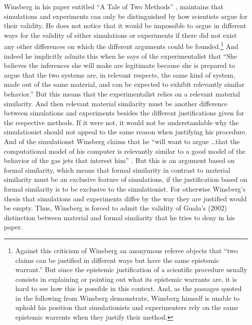 \documentclass[12pt, a4paper]{article}
\numberwithin{equation}{section}
\begin{document}
Winsberg in his paper entitled ``A Tale of Two Methods'' \citep{winsberg:2009}, maintains that simulations and experiments can only be distinguished by how scientists argue for their validity. He does not notice that it would be impossible to argue in different ways for the validity of either simulations or experiments if there did not exist any other differences on which the different arguments could be founded.\footnote{Against this criticism of Winsberg an anonymous referee objects that ``two claims can be justified in different ways but have the same epistemic warrant.'' But since the epistemic justification of a scientific procedure usually consists in explaining or pointing out what its epistemic warrants are, it is hard to see how this is possible in this context. And, as the passages quoted in the following from Winsberg demonstrate, Winsberg himself is unable to uphold his position that simulationists and experimenters rely on the same epistemic warrents when they justify their method.} And indeed he implicitly admits this when he says of the experimentalist that ``She believes the inferences she will make are legitimate because she is prepared to argue that the two systems are, in relevant respects, the same kind of system, made out of the same material, and can be expected to exhibit relevantly similar behavior.'' \citep[p.\ 590]{winsberg:2009} But this means that the experimentalist relies on a relevant material similarity. And then relevant material similarity must be another difference between simulations and experiments besides the different justifications given for the respective methods. If it were not, it would not be understandable why the simulationist should not appeal to the same reason when justifying his procedure. And of the simulationst Winsberg claims that he ``will want to argue \ldots that the computational model of his computer is relevantly similar to a good model of the behavior of the gas jets that interest him'' \citep[p.\ 590]{winsberg:2009}. But this is an argument based on formal similarity, which means that formal similarity in contrast to material similarity must be an exclusive feature of simulations, if the justification based on formal similarity is to be exclusive to the simulationist. For otherwise Winsberg's thesis that simulations and experiments differ by the way they are justified would be empty. Thus, Winsberg is forced to admit the validity of Guala's (2002) distinction between material and formal similarity that he tries to deny in his paper.
\end{document}
